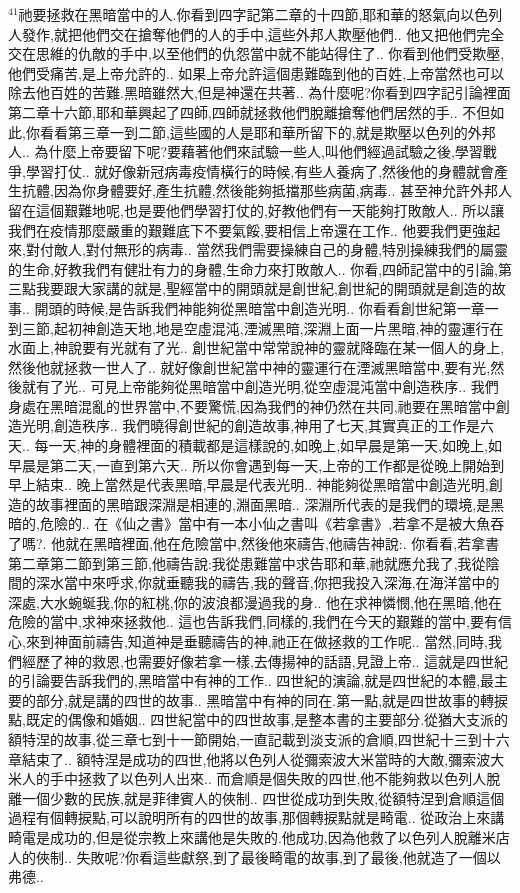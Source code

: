 \documentclass{book}
\begin{document}
$^{41}$祂要拯救在黑暗當中的人.你看到四字記第二章的十四節,耶和華的怒氣向以色列人發作,就把他們交在搶奪他們的人的手中,這些外邦人欺壓他們..
他又把他們完全交在思維的仇敵的手中,以至他們的仇怨當中就不能站得住了..
你看到他們受欺壓,他們受痛苦,是上帝允許的..
如果上帝允許這個患難臨到他的百姓,上帝當然也可以除去他百姓的苦難.黑暗雖然大,但是神還在共著..
為什麼呢?你看到四字記引論裡面第二章十六節,耶和華興起了四師,四師就拯救他們脫離搶奪他們居然的手..
不但如此,你看看第三章一到二節,這些國的人是耶和華所留下的,就是欺壓以色列的外邦人..
為什麼上帝要留下呢?要藉著他們來試驗一些人,叫他們經過試驗之後,學習戰爭,學習打仗..
就好像新冠病毒疫情橫行的時候,有些人養病了,然後他的身體就會產生抗體,因為你身體要好,產生抗體,然後能夠抵擋那些病菌,病毒..
甚至神允許外邦人留在這個艱難地呢,也是要他們學習打仗的,好教他們有一天能夠打敗敵人..
所以讓我們在疫情那麼嚴重的艱難底下不要氣餒,要相信上帝還在工作..
他要我們更強起來,對付敵人,對付無形的病毒..
當然我們需要操練自己的身體,特別操練我們的屬靈的生命,好教我們有健壯有力的身體,生命力來打敗敵人..
你看,四師記當中的引論,第三點我要跟大家講的就是,聖經當中的開頭就是創世紀,創世紀的開頭就是創造的故事..
開頭的時候,是告訴我們神能夠從黑暗當中創造光明..
你看看創世紀第一章一到三節,起初神創造天地,地是空虛混沌,湮滅黑暗,深淵上面一片黑暗,神的靈運行在水面上,神說要有光就有了光..
創世紀當中常常說神的靈就降臨在某一個人的身上,然後他就拯救一世人了..
就好像創世紀當中神的靈運行在湮滅黑暗當中,要有光,然後就有了光..
可見上帝能夠從黑暗當中創造光明,從空虛混沌當中創造秩序..
我們身處在黑暗混亂的世界當中,不要驚慌,因為我們的神仍然在共同,祂要在黑暗當中創造光明,創造秩序..
我們曉得創世紀的創造故事,神用了七天,其實真正的工作是六天..
每一天,神的身體裡面的積載都是這樣說的,如晚上,如早晨是第一天,如晚上,如早晨是第二天,一直到第六天..
所以你會遇到每一天,上帝的工作都是從晚上開始到早上結束..
晚上當然是代表黑暗,早晨是代表光明..
神能夠從黑暗當中創造光明,創造的故事裡面的黑暗跟深淵是相連的,淵面黑暗..
深淵所代表的是我們的環境,是黑暗的,危險的..
在《仙之書》當中有一本小仙之書叫《若拿書》,若拿不是被大魚吞了嗎?.
他就在黑暗裡面,他在危險當中,然後他來禱告,他禱告神說:.
你看看,若拿書第二章第二節到第三節,他禱告說:我從患難當中求告耶和華,祂就應允我了,我從陰間的深水當中來呼求,你就垂聽我的禱告,我的聲音,你把我投入深海,在海洋當中的深處,大水蜿蜒我,你的紅桃,你的波浪都漫過我的身..
他在求神憐憫,他在黑暗,他在危險的當中,求神來拯救他..
這也告訴我們,同樣的,我們在今天的艱難的當中,要有信心,來到神面前禱告,知道神是垂聽禱告的神,祂正在做拯救的工作呢..
當然,同時,我們經歷了神的救恩,也需要好像若拿一樣,去傳揚神的話語,見證上帝..
這就是四世紀的引論要告訴我們的,黑暗當中有神的工作..
四世紀的演論,就是四世紀的本體,最主要的部分,就是講的四世的故事..
黑暗當中有神的同在.第一點,就是四世故事的轉捩點,既定的偶像和婚姻..
四世紀當中的四世故事,是整本書的主要部分.從猶大支派的額特涅的故事,從三章七到十一節開始,一直記載到淡支派的倉順,四世紀十三到十六章結束了..
額特涅是成功的四世,他將以色列人從彌索波大米當時的大敵,彌索波大米人的手中拯救了以色列人出來..
而倉順是個失敗的四世,他不能夠救以色列人脫離一個少數的民族,就是菲律賓人的俠制..
四世從成功到失敗,從額特涅到倉順這個過程有個轉捩點,可以說明所有的四世的故事,那個轉捩點就是畸電..
從政治上來講畸電是成功的,但是從宗教上來講他是失敗的.他成功,因為他救了以色列人脫離米店人的俠制..
失敗呢?你看這些獻祭,到了最後畸電的故事,到了最後,他就造了一個以弗德..
\end{document}

